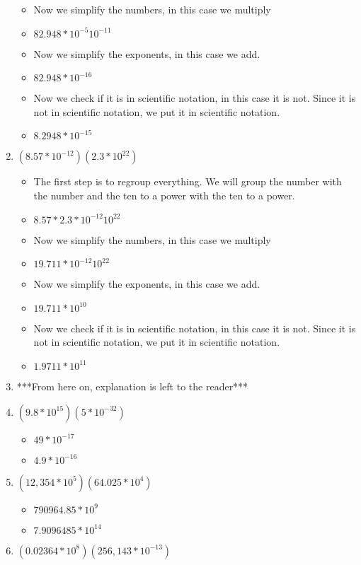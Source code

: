 \begin{enumerate}
\begin{itemize}
  \item [] Now we simplify the numbers, in this case we multiply
  \item $82.948 * 10^{-5}10^{-11}$
  \item [] Now we simplify the exponents, in this case we add.
  \item $82.948 * 10^{-16}$
  \item [] Now we check if it is in scientific notation, in this case it is not. Since it is not in scientific notation, we put it in scientific notation.
  \item $8.2948 *10^{-15}$
  \end{itemize}
\item $(8.57*10^{-12})(2.3*10^{22})$
  \begin{itemize}
  \item [] The first step is to regroup everything. We will group the number with the number and the ten to a power with the ten to a power.
  \item $8.57*2.3 * 10^{-12}10^{22}$
  \item [] Now we simplify the numbers, in this case we multiply
  \item $19.711 * 10^{-12}10^{22}$
  \item [] Now we simplify the exponents, in this case we add.
  \item $19.711 * 10^{10}$
  \item [] Now we check if it is in scientific notation, in this case it is not. Since it is not in scientific notation, we put it in scientific notation.
  \item $1.9711 * 10^{11}$
  \end{itemize}
\item [] ***From here on, explanation is left to the reader***
\item $(9.8*10^{15})(5*10^{-32})$
  \begin{itemize}
  \item $49 * 10^{-17}$
  \item $4.9 * 10^{-16}$
  \end{itemize}
\item $(12,354*10^{5})(64.025*10^{4})$
  \begin{itemize}
  \item $790964.85 * 10^{9}$
  \item $7.9096485 * 10^{14}$
  \end{itemize}
\item $(0.02364*10^{8})(256,143*10^{-13})$

\end{enumerate}
